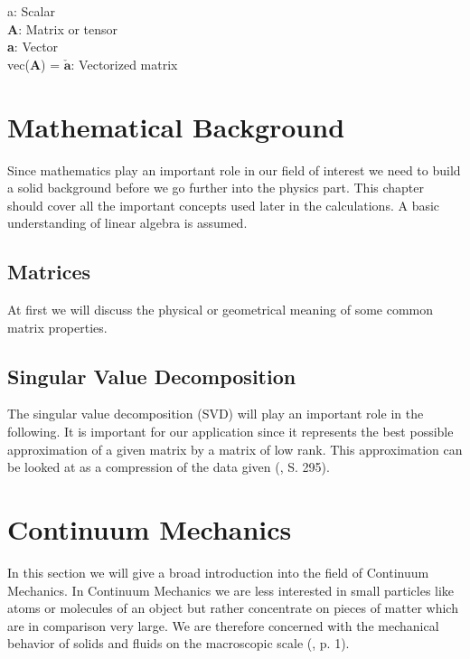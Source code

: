 \begin{addmargin}[1cm]{1cm}
a: Scalar \\
\textbf{A}: Matrix or tensor \\
\textbf{a}: Vector \\
vec(\textbf{A}) = $\boldsymbol{\check{a}}$: Vectorized matrix
\end{addmargin}




\section{Mathematical Background}
Since mathematics play an important role in our field of interest we need to build a solid background before we go further into the physics part. This chapter should cover all the important concepts used later in the calculations. A basic understanding of linear algebra is assumed.


\subsection{Matrices}
At first we will discuss the physical or geometrical meaning of some common matrix properties.


\subsection{Singular Value Decomposition}

The singular value decomposition (SVD) will play an important role in the following. It is important for our application since it represents the best possible approximation of a given matrix by a matrix of low rank. This approximation can be looked at as a compression of the data given (\cite{LiesenMehrmann2015}, S. 295).




\section{Continuum Mechanics}
In this section we will give a broad introduction into the field of Continuum Mechanics. In Continuum Mechanics we are less interested in small particles like atoms or molecules of an object but rather concentrate on pieces of matter which are in comparison very large. We are therefore concerned with the mechanical behavior of solids and fluids on the macroscopic scale (\cite{Spencer1980}, p. 1).


